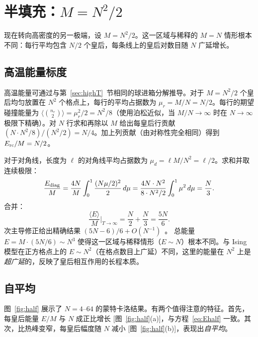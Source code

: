 \documentclass[aps, pre, reprint, amsmath, amssymb, superscriptaddress, floatfix]{revtex4-2}
\begin{document}
\section{半填充：\texorpdfstring{$M = N^2/2$}{M = N\^{}2/2}}
\label{sec:half}

现在转向高密度的另一极端，设 $M = N^2/2$。这一区域与稀释的 $M = N$ 情形根本不同：每行平均包含 $N/2$ 个皇后，每条线上的皇后对数目随 $N$ 广延增长。

\subsection{高温能量标度}

高温能量可通过与第~\ref{sec:highT}~节相同的球进箱分解推导。对于 $M = N^2/2$ 个皇后均匀放置在 $N^2$ 个格点上，每行的平均占据数为 $\mu_r = M/N = N/2$。每行的期望碰撞能量为 $\langle\binom{n_r}{2}\rangle = \mu_r^2/2 = N^2/8$（使用泊松近似，当 $M/N \to \infty$ 时在 $N \to \infty$ 极限下精确）。对 $N$ 行求和再除以 $M$ 给出每皇后行贡献 $(N \cdot N^2/8)/(N^2/2) = N/4$。加上列贡献（由对称性完全相同）得到 $E_{\rm rc}/M = N/2$。

对于对角线，长度为 $\ell$ 的对角线平均占据数为 $\mu_d = \ell M/N^2 = \ell/2$。求和并取连续极限：
\begin{equation}
  \frac{E_{\rm diag}}{M}
  = \frac{4N}{M}\int_0^1 \frac{(N\mu/2)^2}{2}\,d\mu
  = \frac{4N \cdot N^2}{8 \cdot N^2/2}\int_0^1 \mu^2\,d\mu
  = \frac{N}{3}.
  \label{eq:E_half_diag}
\end{equation}
合并：
\begin{equation}
  \frac{\langle E\rangle}{M}\bigg|_{T \to \infty}
  = \frac{N}{2} + \frac{N}{3} = \frac{5N}{6}.
  \label{eq:Ehalf}
\end{equation}
次主导修正给出精确结果 $(5N - 6)/6 + O(N^{-1})$~\cite{Polson2024}。
总能量 $E = M \cdot (5N/6) \sim N^3$ 使得这一区域与稀释情形（$E \sim N$）根本不同。与 Ising 模型在正方格点上的 $E \sim N^2$（在格点数目上广延）不同，这里的能量在 $N^2$ 上是\emph{超广延}的，反映了皇后相互作用的长程本质。

\subsection{自平均}

图~\ref{fig:half} 展示了 $N = 4$--$64$ 的蒙特卡洛结果。有两个值得注意的特征。首先，每皇后能量 $E/M$ 与 $N$ 成正比增长 [图~\ref{fig:half}(a)]，与方程~\eqref{eq:Ehalf} 一致。其次，比热峰变窄，每皇后幅度随 $N$ 减小 [图~\ref{fig:half}(b)]，表现出\textit{自平均}。
\end{document}
